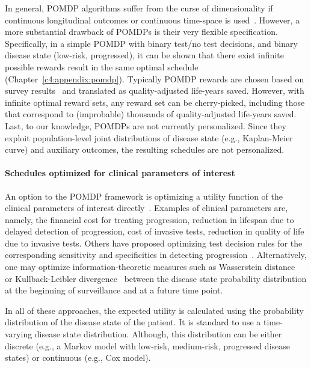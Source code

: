 In general, POMDP algorithms suffer from the curse of dimensionality if continuous longitudinal outcomes or continuous time-space is used~\citep{sunberg2018online}. However, a more substantial drawback of POMDPs is their very flexible specification. Specifically, in a simple POMDP with binary test/no test decisions, and binary disease state (low-risk, progressed), it can be shown that there exist infinite possible rewards result in the same optimal schedule (Chapter~\ref{c4:appendix:pomdp}). Typically POMDP rewards are chosen based on survey results~\citep{denton2018optimization} and translated as quality-adjusted life-years saved. However, with infinite optimal reward sets, any reward set can be cherry-picked, including those that correspond to (improbable) thousands of quality-adjusted life-years saved. Last, to our knowledge, POMDPs are not currently personalized. Since they exploit population-level joint distributions of disease state (e.g., Kaplan-Meier curve) and auxiliary outcomes, the resulting schedules are not personalized.

\paragraph{Schedules optimized for clinical parameters of interest} An option to the POMDP framework is optimizing a utility function of the clinical parameters of interest directly~\citep{bebu2018optimal,parmigiani1996optimal}. Examples of clinical parameters are, namely, the financial cost for treating progression, reduction in lifespan due to delayed detection of progression, cost of invasive tests, reduction in quality of life due to invasive tests. Others have proposed optimizing test decision rules for the corresponding sensitivity and specificities in detecting progression~\citep{wang2019learning}. Alternatively, one may optimize information-theoretic measures such as Wasserstein distance~\citep{hanin2001optimal} or Kullback-Leibler divergence~\citep{rizopoulos2016personalized} between the disease state probability distribution at the beginning of surveillance and at a future time point. 

In all of these approaches, the expected utility is calculated using the probability distribution of the disease state of the patient. It is standard to use a time-varying disease state distribution. Although, this distribution can be either discrete (e.g., a Markov model with low-risk, medium-risk, progressed disease states) or continuous (e.g., Cox model).

